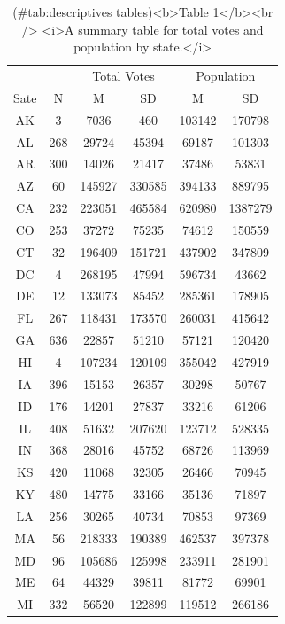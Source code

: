 \documentclass[
  english,
  man]{apa6}
\begin{document}
\begin{table}

\caption{(\#tab:descriptives tables)<b>Table 1</b><br /> <i>A summary table for total votes and population by state.</i>}
\centering
\begin{tabular}[t]{c|c|c|c|c|c}
\hline
\multicolumn{2}{c|}{ } & \multicolumn{2}{c|}{Total Votes} & \multicolumn{2}{c}{Population} \\
\cline{3-4} \cline{5-6}
Sate & N & M & SD & M & SD\\
\hline
AK & 3 & 7036 & 460 & 103142 & 170798\\
\hline
AL & 268 & 29724 & 45394 & 69187 & 101303\\
\hline
AR & 300 & 14026 & 21417 & 37486 & 53831\\
\hline
AZ & 60 & 145927 & 330585 & 394133 & 889795\\
\hline
CA & 232 & 223051 & 465584 & 620980 & 1387279\\
\hline
CO & 253 & 37272 & 75235 & 74612 & 150559\\
\hline
CT & 32 & 196409 & 151721 & 437902 & 347809\\
\hline
DC & 4 & 268195 & 47994 & 596734 & 43662\\
\hline
DE & 12 & 133073 & 85452 & 285361 & 178905\\
\hline
FL & 267 & 118431 & 173570 & 260031 & 415642\\
\hline
GA & 636 & 22857 & 51210 & 57121 & 120420\\
\hline
HI & 4 & 107234 & 120109 & 355042 & 427919\\
\hline
IA & 396 & 15153 & 26357 & 30298 & 50767\\
\hline
ID & 176 & 14201 & 27837 & 33216 & 61206\\
\hline
IL & 408 & 51632 & 207620 & 123712 & 528335\\
\hline
IN & 368 & 28016 & 45752 & 68726 & 113969\\
\hline
KS & 420 & 11068 & 32305 & 26466 & 70945\\
\hline
KY & 480 & 14775 & 33166 & 35136 & 71897\\
\hline
LA & 256 & 30265 & 40734 & 70853 & 97369\\
\hline
MA & 56 & 218333 & 190389 & 462537 & 397378\\
\hline
MD & 96 & 105686 & 125998 & 233911 & 281901\\
\hline
ME & 64 & 44329 & 39811 & 81772 & 69901\\
\hline
MI & 332 & 56520 & 122899 & 119512 & 266186\\

\end{tabular}
\end{table}
\end{document}
